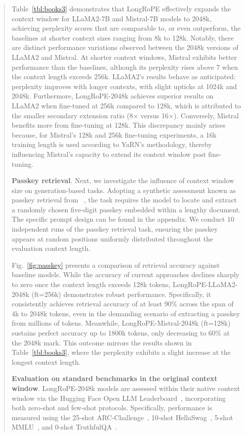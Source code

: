 \begin{abstract}
Table~\ref{tbl:books3} demonstrates that LongRoPE effectively expands the context window for LLaMA2-7B and Mistral-7B models to 2048k, achieving perplexity scores that are comparable to, or even outperform, the baselines at shorter context sizes ranging from 8k to 128k. Notably, there are distinct performance variations observed between the 2048k versions of LLaMA2 and Mistral. At shorter context windows, Mistral exhibits better performance than the baselines, although its perplexity rises above 7 when the context length exceeds 256k. LLaMA2's results behave as anticipated: perplexity improves with longer contexts, with slight upticks at 1024k and 2048k. Furthermore, LongRoPE-2048k achieves superior results on LLaMA2 when fine-tuned at 256k compared to 128k, which is attributed to the smaller secondary extension ratio (8$\times$ versus 16$\times$). Conversely, Mistral benefits more from fine-tuning at 128k. This discrepancy mainly arises because, for Mistral's 128k and 256k fine-tuning experiments, a 16k training length is used according to YaRN's methodology, thereby influencing Mistral's capacity to extend its context window post fine-tuning.

\textbf{Passkey retrieval}. Next, we investigate the influence of context window size on generation-based tasks. Adopting a synthetic assessment known as passkey retrieval from ~\cite{passkey}, the task requires the model to locate and extract a randomly chosen five-digit passkey embedded within a lengthy document. The specific prompt design can be found in the appendix. We conduct 10 independent runs of the passkey retrieval task, ensuring the passkey appears at random positions uniformly distributed throughout the evaluation context length.

Fig.~\ref{fig:passkey} presents a comparison of retrieval accuracy against baseline models. While the accuracy of current approaches declines sharply to zero once the context length exceeds 128k tokens, LongRoPE-LLaMA2-2048k (ft=256k) demonstrates robust performance. Specifically, it consistently achieves retrieval accuracy of at least 90\% across the span of 4k to 2048k tokens, even in the demanding scenario of extracting a passkey from millions of tokens. Meanwhile, LongRoPE-Mistral-2048k (ft=128k) sustains perfect accuracy up to 1800k tokens, only decreasing to 60\% at the 2048k mark. This outcome mirrors the results shown in Table~\ref{tbl:books3}, where the perplexity exhibits a slight increase at the longest context length.

\textbf{Evaluation on standard benchmarks in the original context window}. LongRoPE-2048k models are assessed within their native context window via the Hugging Face Open LLM Leaderboard~\cite{huggingfaceboard}, incorporating both zero-shot and few-shot protocols. Specifically, performance is measured using the 25-shot ARC-Challenge~\cite{allenai:arc}, 10-shot HellaSwag~\cite{zellers2019hellaswag}, 5-shot MMLU~\cite{mmlu}, and 0-shot TruthfulQA~\cite{lin2021truthfulqa}.


\end{abstract}
